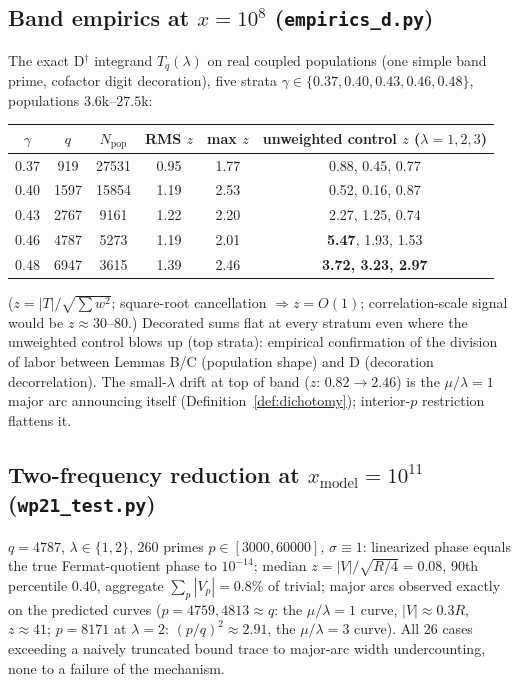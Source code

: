 \subsection*{Band empirics at $x=10^8$ (\texttt{empirics\_d.py})}
The exact D$^\dagger$ integrand $T_q(\lambda)$ on real coupled
populations (one simple band prime, cofactor digit decoration), five
strata $\gamma\in\{0.37,0.40,0.43,0.46,0.48\}$, populations
$3.6$k--$27.5$k:
\begin{center}
\begin{tabular}{cccccc}
\toprule
$\gamma$ & $q$ & $N_{\mathrm{pop}}$ & RMS $z$ & max $z$ &
unweighted control $z$ ($\lambda=1,2,3$)\\
\midrule
0.37 & 919  & 27531 & 0.95 & 1.77 & 0.88, 0.45, 0.77\\
0.40 & 1597 & 15854 & 1.19 & 2.53 & 0.52, 0.16, 0.87\\
0.43 & 2767 & 9161  & 1.22 & 2.20 & 2.27, 1.25, 0.74\\
0.46 & 4787 & 5273  & 1.19 & 2.01 & \textbf{5.47}, 1.93, 1.53\\
0.48 & 6947 & 3615  & 1.39 & 2.46 & \textbf{3.72, 3.23, 2.97}\\
\bottomrule
\end{tabular}
\end{center}
($z=|T|/\sqrt{\sum w^2}$; square-root cancellation $\Rightarrow z=O(1)$;
correlation-scale signal would be $z\approx30$--$80$.) Decorated sums
flat at every stratum even where the unweighted control blows up
(top strata): empirical confirmation of the division of labor between
Lemmas B/C (population shape) and D (decoration decorrelation). The
small-$\lambda$ drift at top of band ($z$: $0.82\to2.46$) is the
$\mu/\lambda=1$ major arc announcing itself
(Definition~\ref{def:dichotomy}); interior-$p$ restriction flattens it.

\subsection*{Two-frequency reduction at $x_{\mathrm{model}}=10^{11}$
(\texttt{wp21\_test.py})}
$q=4787$, $\lambda\in\{1,2\}$, 260 primes $p\in[3000,60000]$,
$\sigma\equiv1$: linearized phase equals the true Fermat-quotient phase
to $10^{-14}$; median $z=|V|/\sqrt{R/4}=0.08$, 90th percentile $0.40$,
aggregate $\sum_p|V_p|=0.8\%$ of trivial; major arcs observed exactly on
the predicted curves ($p=4759,4813\approx q$: the $\mu/\lambda=1$ curve,
$|V|\approx0.3R$, $z\approx41$; $p=8171$ at $\lambda=2$:
$(p/q)^2\approx2.91$, the $\mu/\lambda=3$ curve). All 26 cases exceeding
a naively truncated bound trace to major-arc width undercounting, none
to a failure of the mechanism.

